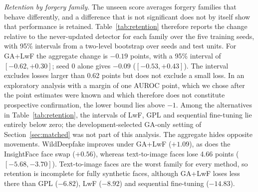 \documentclass[journal]{IEEEtran}
\begin{document}
\textit{Retention by forgery family.}\label{sec:retention} The unseen score averages forgery families that behave differently, and a difference that is not significant does not by itself show that performance is retained. Table~\ref{tab:retention} therefore reports the change relative to the never-updated detector for each family over the five training seeds, with 95\% intervals from a two-level bootstrap over seeds and test units. For GA+LwF the aggregate change is $-0.19$ points, with a 95\% interval of $[-0.62,+0.30]$; seed 0 alone gives $-0.09$ ($[-0.53,+0.43]$). The interval excludes losses larger than 0.62 points but does not exclude a small loss. In an exploratory analysis with a margin of one AUROC point, which we chose after the point estimates were known and which therefore does not constitute prospective confirmation, the lower bound lies above $-1$. Among the alternatives in Table~\ref{tab:retention}, the intervals of LwF, GPL and sequential fine-tuning lie entirely below zero; the development-selected GA-only setting of Section~\ref{sec:matched} was not part of this analysis. The aggregate hides opposite movements. WildDeepfake improves under GA+LwF ($+1.09$), as does the InsightFace face swap ($+0.56$), whereas text-to-image faces lose 4.66 points ($[-5.68,-3.70]$). Text-to-image faces are the worst family for every method, so retention is incomplete for fully synthetic faces, although GA+LwF loses less there than GPL ($-6.82$), LwF ($-8.92$) and sequential fine-tuning ($-14.83$).
\end{document}
